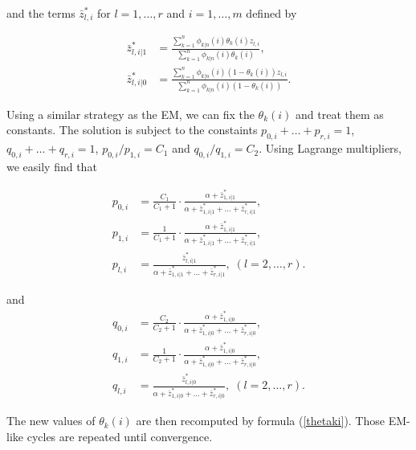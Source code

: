 \documentclass[12pt]{article}
\begin{document}
\begin{appendices}
\noindent
    and the terms $\bar{z}_{l,i}^*$ for $l = 1, \ldots, r$ and
    $i = 1, \ldots, m$ defined by

    \begin{align*}
    \bar{z}_{l,i|1}^* &= \frac{\sum_{k=1}^n\phi_{k|n}(i)
      \theta_k(i)z_{l,i}}{\sum_{k=1}^n\phi_{k|n}(i)\theta_k(i)}, \\
    \bar{z}_{l,i|0}^* &= \frac{\sum_{k=1}^n\phi_{k|n}(i)
      (1-\theta_k(i))z_{l,i}}{\sum_{k=1}^n\phi_{k|n}(i)(1-\theta_k(i))}.
    \end{align*}

    Using a similar strategy as the EM, we can fix the $\theta_k(i)$
    and treat them as constants. The solution is subject to the
    constaints $p_{0,i}+\ldots+p_{r,i} = 1$,
    $q_{0,i}+\ldots+q_{r,i} = 1$, $p_{0,i}/p_{1,i} = C_1$ and
    $q_{0,i}/q_{1,i} = C_2$. Using Lagrange multipliers, we easily
    find that

    \begin{align*}
    p_{0,i} &= \frac{C_1}{C_1+1} \cdot \frac{\alpha+\bar{z}_{1,i|1}^*}
      {\alpha + \bar{z}_{1,i|1}^* +
      \ldots + \bar{z}_{r,i|1}^*}, \\
    p_{1,i} &= \frac{1}{C_1+1} \cdot \frac{\alpha+\bar{z}_{1,i|1}^*}
      {\alpha + \bar{z}_{1,i|1}^* +
      \ldots + \bar{z}_{r,i|1}^*}, \\
    p_{l,i} &= \frac{\bar{z}_{l,i|1}^*}{\alpha + \bar{z}_{1,i|1}^* +
      \ldots + \bar{z}_{r,i|1}^*}, \; (l = 2, \ldots, r).
    \end{align*}

\noindent
    and
    \begin{align*}
    q_{0,i} &= \frac{C_2}{C_2+1} \cdot \frac{\alpha+\bar{z}_{1,i|0}^*}
      {\alpha + \bar{z}_{1,i|0}^* +
      \ldots + \bar{z}_{r,i|0}^*}, \\
    q_{1,i} &= \frac{1}{C_2+1} \cdot \frac{\alpha+\bar{z}_{1,i|0}^*}
      {\alpha + \bar{z}_{1,i|0}^* +
      \ldots + \bar{z}_{r,i|0}^*}, \\
    q_{l,i} &= \frac{\bar{z}_{l,i|0}^*}{\alpha + \bar{z}_{1,i|0}^* +
      \ldots + \bar{z}_{r,i|0}^*}, \; (l = 2, \ldots, r).
    \end{align*}


    The new values of $\theta_k(i)$ are then recomputed by
    formula (\ref{thetaki}). Those EM-like cycles are repeated
    until convergence.

\end{appendices}
\end{document}
